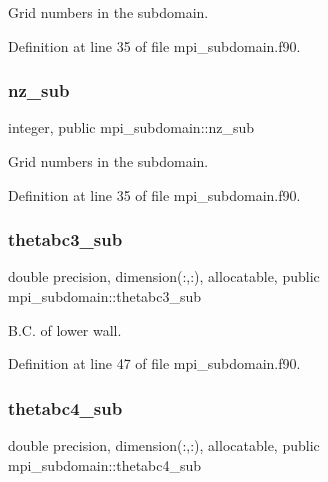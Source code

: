 Grid numbers in the subdomain. 



Definition at line 35 of file mpi\+\_\+subdomain.\+f90.

\mbox{\label{namespacempi__subdomain_a07555cc931ac78376a4c81207662251f}} 
\subsubsection{\texorpdfstring{nz\_sub}{nz\_sub}}
{\footnotesize\ttfamily integer, public mpi\+\_\+subdomain\+::nz\+\_\+sub}



Grid numbers in the subdomain. 



Definition at line 35 of file mpi\+\_\+subdomain.\+f90.

\mbox{\label{namespacempi__subdomain_ad61f27caf5f32301a077e21363c2d73b}} 
\subsubsection{\texorpdfstring{thetabc3\_sub}{thetabc3\_sub}}
{\footnotesize\ttfamily double precision, dimension(\+:,\+:), allocatable, public mpi\+\_\+subdomain\+::thetabc3\+\_\+sub}



B.\+C. of lower wall. 



Definition at line 47 of file mpi\+\_\+subdomain.\+f90.

\mbox{\label{namespacempi__subdomain_ad1705bede0c0d39ad16f9f94afe32be6}} 
\subsubsection{\texorpdfstring{thetabc4\_sub}{thetabc4\_sub}}
{\footnotesize\ttfamily double precision, dimension(\+:,\+:), allocatable, public mpi\+\_\+subdomain\+::thetabc4\+\_\+sub}



